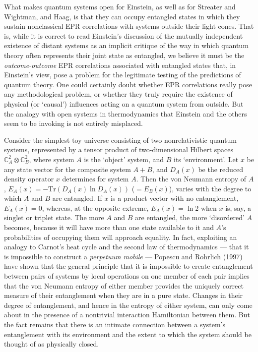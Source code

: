 \documentclass[12pt]{article}
\begin{document}
What makes quantum systems open 
for Einstein, as well as for Streater and Wightman, and Haag, 
is that they can occupy entangled states in which 
they sustain nonclassical EPR 
correlations with systems outside 
their light cones.  That is, while it is 
correct to read Einstein's discussion of the 
mutually independent existence of distant systems as an implicit 
critique of 
the way in which quantum theory often represents their joint state as 
entangled, we believe it must be the \emph{outcome-outcome} EPR correlations 
associated with entangled 
states that, in Einstein's view, pose a problem for the 
legitimate testing of the predictions of quantum theory.  One could 
certainly doubt 
whether EPR correlations really pose any 
methodological problem, or whether they
 truly require the existence of physical (or `causal') influences 
acting on a quantum system from outside.  But the analogy with 
open systems in thermodynamics that Einstein and the others seem to be 
invoking 
is not entirely misplaced.  

Consider the simplest 
toy universe consisting of two nonrelativistic quantum systems, 
represented by a tensor product of two-dimensional Hilbert spaces 
$\mathbb{C}_{A}^{2}\otimes\mathbb{C}_{B}^{2}$, where system $A$ is the `object' system, 
and $B$ its `environment'.  Let $x$ be any state vector for the 
composite system $A+B$, and $D_{A}(x)$ be the reduced density 
operator $x$ determines for system 
$A$.  Then the von Neumann entropy of $A$, 
$E_{A}(x)=-\mbox{Tr}(D_{A}(x)\ln D_{A}(x))$ ($=E_{B}(x)$), 
varies with the degree to which $A$ and $B$ are entangled.  
If $x$ is a product vector with no entanglement, $E_{A}(x)=0$, whereas, at the opposite extreme, 
$E_{A}(x)=\ln 2$ when $x$ is, say, a singlet or triplet state.  The 
more $A$ and $B$ are entangled, the more `disordered' $A$ 
becomes, because it will have more than one state available to it and 
$A$'s probabilities of occupying them will approach equality. 
In fact, exploiting an analogy to Carnot's heat cycle and the second law 
of thermodynamics --- that it is 
impossible to construct a \emph{perpetuum mobile} --- Popescu and Rohrlich (1997) 
have shown that the general principle that it is impossible to create
entanglement between pairs of systems by local operations on one 
member of each pair  implies that the von Neumann 
entropy of either member provides the uniquely correct 
measure of their 
entanglement when they are in a pure state. 
Changes in their degree of entanglement, and hence 
in the entropy of either system, can only come about
in the presence of a nontrivial interaction Hamiltonian between them.  
But the fact remains that there is an intimate connection between a 
system's entanglement with its environment and the extent to which the 
system should be thought of as physically closed.   
\end{document}

